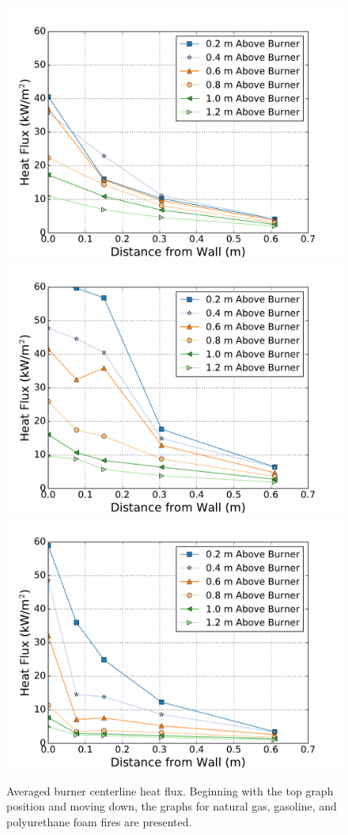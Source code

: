 \documentclass[twoside]{uocthesis}
\begin{document}
{ \begin{figure}[p]
	\centering
	\includegraphics[width=.625\columnwidth]{../Figures/IWGB_NG_HF_Center_Avg}\\
	\includegraphics[width=.625\columnwidth]{../Figures/IWGB_GAS_HF_Center_Avg}\\
	\includegraphics[width=.625\columnwidth]{../Figures/IWGB_PUF_HF_Center_Avg}\\
	\caption[Averaged burner centerline heat flux for the natural gas, gasoline, and foam fires]{Averaged burner centerline heat flux. Beginning with the top graph position and moving down, the graphs for natural gas, gasoline, and polyurethane foam fires are presented.}
	\label{IWGB_HF_Comp_Center}
\end{figure}

}
\end{document}
